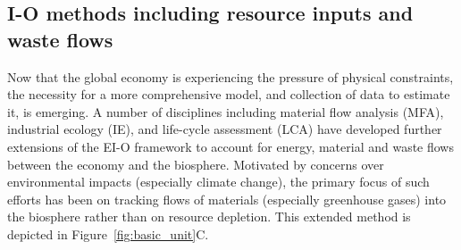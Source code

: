 %

\subsection{I-O methods including resource inputs and waste flows}
\label{sec:IO_waste}
Now that the global economy is experiencing the pressure of physical constraints, 
the necessity for a more comprehensive model, 
and collection of data to estimate it,
is emerging. 
A number of disciplines including
material flow analysis (MFA), 
industrial ecology (IE), and 
life-cycle assessment (LCA) 
have developed further extensions of the EI-O
framework to account for energy, material and waste flows
between the economy and the biosphere.
Motivated by concerns over environmental impacts
(especially climate change),
the primary focus of such efforts has been on
tracking flows of materials
(especially greenhouse gases)
into the biosphere
rather than on resource depletion.\cite{ConAccount1998,
Lenzen1998, Hoekstra2003, Bailey2004, Pedersen2006, Turner2007}
This extended method is depicted in Figure~\ref{fig:basic_unit}C. 


